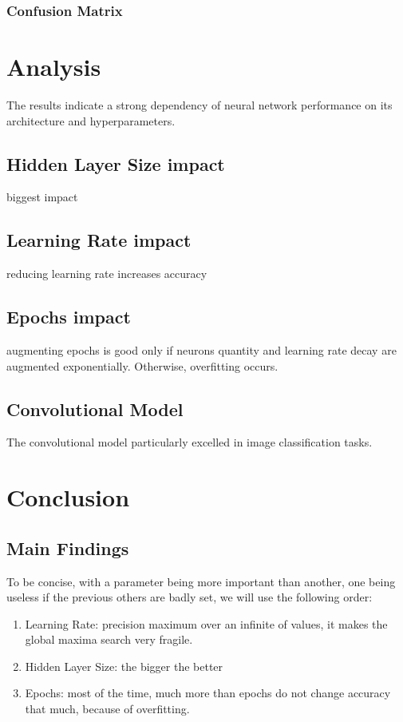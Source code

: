 \documentclass[utf8,1pt]{extarticle} %
\begin{document}
\subsubsection{Confusion Matrix}

\section{Analysis}
The results indicate a strong dependency of 
neural network performance on its 
architecture and 
hyperparameters. 
\subsection{Hidden Layer Size impact}
biggest impact
\subsection{Learning Rate impact}
reducing learning rate increases accuracy
\subsection{Epochs impact}
augmenting epochs is good only if neurons quantity and learning rate decay are augmented exponentially.
Otherwise, overfitting occurs.

\subsection{Convolutional Model}
The convolutional model particularly excelled in 
image classification tasks.

\section{Conclusion}
\subsection{Main Findings}
To be concise, 
with a parameter being more important than another, 
one being useless if the previous others are badly set, 
we will use the following order:
\begin{enumerate}
    \item Learning Rate: precision maximum over an infinite of values, it makes the global maxima search very fragile.
    \item Hidden Layer Size: the bigger the better
    \item Epochs: most of the time, much more than epochs do not change accuracy that much,  because of overfitting.
\end{enumerate}
\end{document}
